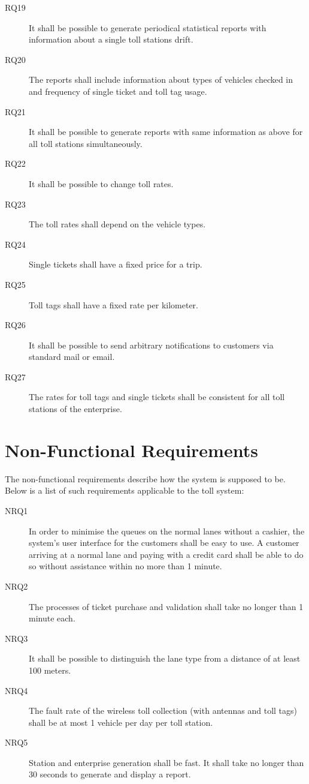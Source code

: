 \begin{description}
  \item[RQ19] It shall be possible to generate periodical statistical reports with information about a single toll stations drift.
  \item[RQ20] The reports shall include information about types of vehicles checked in and frequency of single ticket and toll tag usage.
  \item[RQ21] It shall be possible to generate reports with same information as above for all toll stations simultaneously.

  \item[RQ22] It shall be possible to change toll rates.
  \item[RQ23] The toll rates shall depend on the vehicle types.
  \item[RQ24] Single tickets shall have a fixed price for a trip.
  \item[RQ25] Toll tags shall have a fixed rate per kilometer.
  \item[RQ26] It shall be possible to send arbitrary notifications to customers via standard mail or email.
  \item[RQ27] The rates for toll tags and single tickets shall be consistent for all toll stations of the enterprise.

\end{description}
\section{Non-Functional Requirements}
The non-functional requirements describe how the system is supposed to be. Below is a list of such requirements applicable to the toll system:

\begin{description}
  \item[NRQ1] In order to minimise the queues on the normal lanes without a cashier, the system's user interface for the customers shall be easy to use. A customer arriving at a normal lane and paying with a credit card shall be able to do so without assistance within no more than 1 minute. 
  \item[NRQ2] The processes of ticket purchase and validation shall take no longer than 1 minute each.
  \item[NRQ3] It shall be possible to distinguish the lane type from a distance of at least 100 meters.
  \item[NRQ4] The fault rate of the wireless toll collection (with antennas and toll tags) shall be at most 1 vehicle per day per toll station.
  \item[NRQ5] Station and enterprise generation shall be fast. It shall take no longer than 30 seconds to generate and display a report.
\end{description}